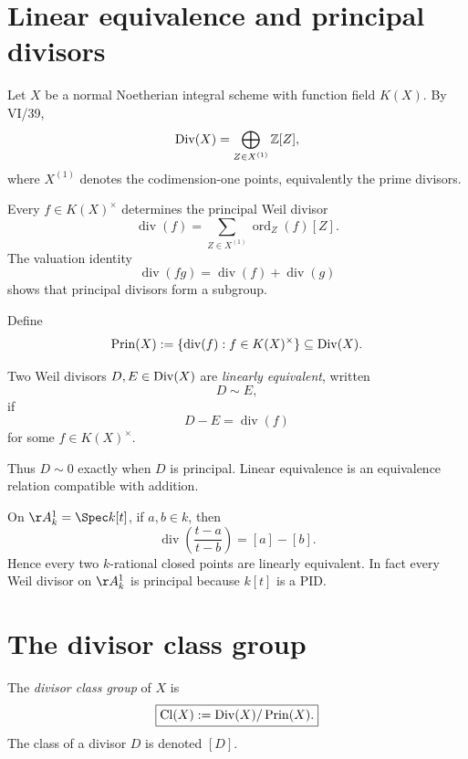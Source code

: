 \section{Linear equivalence and principal divisors}

Let \(X\) be a normal Noetherian integral scheme with function field \(K(X)\). By VI/39,
\[
  \operatorname{Div}(X)=\bigoplus_{Z\in X^{(1)}}\mathbb Z[Z],
\]
where \(X^{(1)}\) denotes the codimension-one points, equivalently the prime divisors.

Every \(f\in K(X)^\times\) determines the principal Weil divisor
\[
  \operatorname{div}(f)
  =
  \sum_{Z\in X^{(1)}}\operatorname{ord}_Z(f)[Z].
\]
The valuation identity
\[
  \operatorname{div}(fg)
  =
  \operatorname{div}(f)+\operatorname{div}(g)
\]
shows that principal divisors form a subgroup.

\begin{definition}\label{def:vi41-principal-subgroup}
Define
\[
  \operatorname{Prin}(X)
  :=
  \{\operatorname{div}(f):f\in K(X)^\times\}
  \subseteq
  \operatorname{Div}(X).
\]
\end{definition}

\begin{definition}\label{def:vi41-linear-equivalence}
Two Weil divisors \(D,E\in\operatorname{Div}(X)\) are \emph{linearly equivalent}, written
\[
  D\sim E,
\]
if
\[
  D-E=\operatorname{div}(f)
\]
for some \(f\in K(X)^\times\).
\end{definition}

Thus \(D\sim0\) exactly when \(D\) is principal. Linear equivalence is an equivalence relation compatible with addition.

\begin{example}\label{ex:vi41-a1-points}
On \(\AA^1_k=\Spec k[t]\), if \(a,b\in k\), then
\[
  \operatorname{div}\!\left(\frac{t-a}{t-b}\right)=[a]-[b].
\]
Hence every two \(k\)-rational closed points are linearly equivalent. In fact every Weil divisor on \(\AA^1_k\) is principal because \(k[t]\) is a PID.
\end{example}

\section{The divisor class group}

\begin{definition}\label{def:vi41-class-group}
The \emph{divisor class group} of \(X\) is
\[
  \boxed{\operatorname{Cl}(X):=\operatorname{Div}(X)/\operatorname{Prin}(X).}
\]
The class of a divisor \(D\) is denoted \([D]\).
\end{definition}


